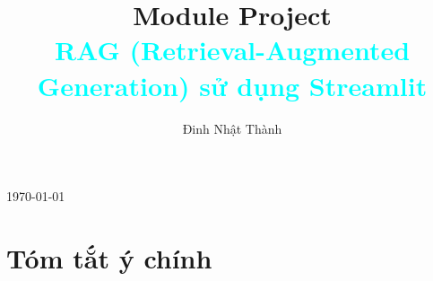 \documentclass[11pt]{article}
\title{{Module Project}\\[0.5em]\textcolor{cyan}{RAG (Retrieval-Augmented Generation) sử dụng Streamlit}}
\author{Đinh Nhật Thành}
\date{}
\renewcommand{\maketitle}{} %
\begin{document}
\maketitle

\begin{titlepage}
    \centering
    \vspace*{\fill}

    {\Huge \textbf{\thetitle} \par}
    \vspace{2em}

    {\Large \textbf{\theauthor} \par}
    \vspace{1em}

    {\large \today \par}

    \vspace*{\fill}
    \thispagestyle{fancy}
\end{titlepage}

\newpage
\tableofcontents
\thispagestyle{fancy}


\newpage

\renewcommand{\thesubsection}{\arabic{subsection}}
\newpage


\section{Tóm tắt ý chính}
\end{document}
